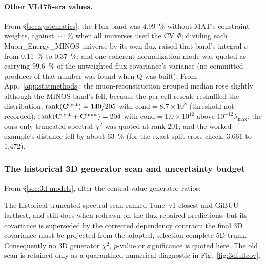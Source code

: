 \paragraph{Other VL175-era values.} From \S\ref{sec:systematics}: the Flux band was \SI{4.99}{\percent} without MAT's constraint weights, against $\sim\SI{1}{\percent}$ when all universes used the CV $\Phi$; dividing each Muon\_Energy\_MINOS universe by its own flux raised that band's integral $\sigma$ from \SI{0.11}{\percent} to \SI{0.37}{\percent}; and one coherent normalization mode was quoted as carrying \SI{99.6}{\percent} of the unweighted flux covariance's variance (no committed producer of that number was found when Q was built). From App.~\ref{app:statmethods}: the muon-reconstruction grouped median rose slightly although the MINOS band's fell, because the per-cell rescale reshuffled the distribution; $\mathrm{rank}(\mathbf{C}^{\text{syst}}) = 140/205$ with $\mathrm{cond}=8.7\times10^{8}$ (threshold not recorded); $\mathrm{rank}(\mathbf{C}^{\text{syst}}+\mathbf{C}^{\text{boot}})=204$ with $\mathrm{cond}=1.0\times10^{12}$ above $10^{-12}\lambda_{\max}$; the ours-only truncated-spectral $\chi^{2}$ was quoted at rank $201$; and the worked example's distance fell by about \SI{63}{\percent} (for the exact-split cross-check, $3.661$ to $1.472$).


\subsubsection{The historical 3D generator scan and uncertainty budget}
From \S\ref{sec:3d-models}, after the central-value generator ratios:

The historical truncated-spectral scan ranked Tune~v1 closest and GiBUU farthest, and still does when redrawn on the flux-repaired predictions, but its covariance is superseded by the corrected dependency contract: the final 3D covariance must be projected from the adopted, selection-complete 5D trunk. Consequently no 3D generator $\chi^{2}$, $p$-value or significance is quoted here. The old scan is retained only as a quarantined numerical diagnostic in Fig.~\ref{fig:3dfullcov}.

